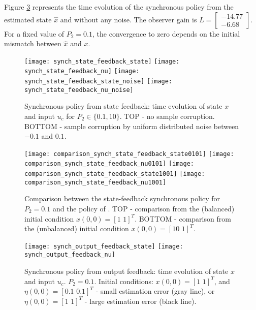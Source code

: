 \documentclass[twocolumn]{autart}
\newcommand{\smallmat}[1]{\left[ \begin{smallmatrix}#1
    \end{smallmatrix} \right]}
\begin{document}
{Figure \ref{exampleA:fig2} represents the time evolution of
the synchronous policy from the estimated state $\hat{x}$ and
without any noise. The observer gain is 
$L = \smallmat{-14.77 \\ -6.68}$. For a fixed value of $P_2=0.1$, 
the convergence to zero depends on the initial 
mismatch between $\hat{x}$ and $x$. 
}

\begin{figure}[ht!]
\begin{center}
\texttt{[image: synch\_state\_feedback\_state]}
\texttt{[image: synch\_state\_feedback\_nu]}
\texttt{[image: synch\_state\_feedback\_state\_noise]}
\texttt{[image: synch\_state\_feedback\_nu\_noise]}
\caption{Synchronous policy from state feedback: time evolution of
state $x$ and input $u_c$ for $P_2\in\{0.1,10\}$.
TOP - no sample corruption. BOTTOM - sample corruption
by uniform distributed noise between $-0.1$ and $0.1$.}
\label{exampleA:fig1}
\end{center}
\end{figure}

\begin{figure}[ht!]
\begin{center}
\texttt{[image: comparison\_synch\_state\_feedback\_state0101]}
\texttt{[image: comparison\_synch\_state\_feedback\_nu0101]}
\texttt{[image: comparison\_synch\_state\_feedback\_state1001]}
\texttt{[image: comparison\_synch\_state\_feedback\_nu1001]}
\caption{Comparison between the state-feedback synchronous policy for
$P_2 = 0.1$
and the policy of \cite{Tabuada07}.
TOP - comparison from the (balanced) initial condition $x(0,0) = [1\,\,1]^T$.
BOTTOM - comparison from the (unbalanced) initial condition $x(0,0) = [10\,\,1]^T$.}
\label{exampleA:fig1bis}
\end{center}
\end{figure}

 
\begin{figure}[ht!]
\begin{center}
\texttt{[image: synch\_output\_feedback\_state]}
\texttt{[image: synch\_output\_feedback\_nu]}
\caption{Synchronous policy from output feedback: time evolution of
state $x$ and input $u_c$. $P_2=0.1$. Initial conditions:
$x(0,0) = [1\,\,1]^T$, and
$\eta(0,0) = [0.1\,\,0.1]^T$ - small estimation error (gray line), or 
$\eta(0,0) = [1\,\,1]^T$ - large estimation error (black line).  }
\label{exampleA:fig2}  
\end{center}
\end{figure}
\end{document}
